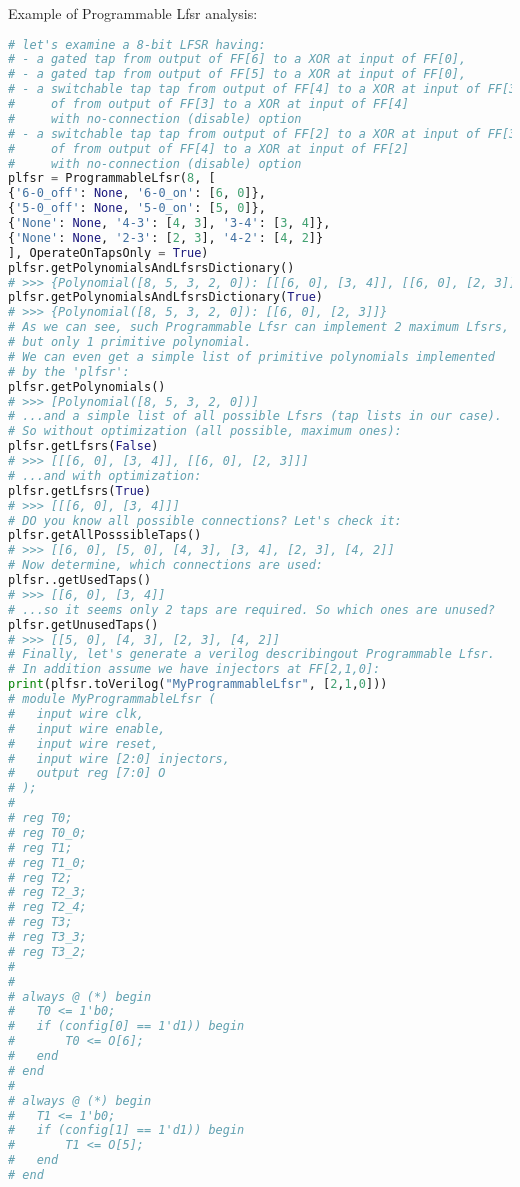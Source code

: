 \label{programmablelfsrexample}
Example of Programmable Lfsr analysis:
\begin{lstlisting}[language=Python]
# let's examine a 8-bit LFSR having:
# - a gated tap from output of FF[6] to a XOR at input of FF[0], 
# - a gated tap from output of FF[5] to a XOR at input of FF[0], 
# - a switchable tap tap from output of FF[4] to a XOR at input of FF[3]
#     of from output of FF[3] to a XOR at input of FF[4]
#     with no-connection (disable) option
# - a switchable tap tap from output of FF[2] to a XOR at input of FF[3]
#     of from output of FF[4] to a XOR at input of FF[2]
#     with no-connection (disable) option
plfsr = ProgrammableLfsr(8, [
{'6-0_off': None, '6-0_on': [6, 0]},
{'5-0_off': None, '5-0_on': [5, 0]},
{'None': None, '4-3': [4, 3], '3-4': [3, 4]},
{'None': None, '2-3': [2, 3], '4-2': [4, 2]}
], OperateOnTapsOnly = True)
plfsr.getPolynomialsAndLfsrsDictionary()
# >>> {Polynomial([8, 5, 3, 2, 0]): [[[6, 0], [3, 4]], [[6, 0], [2, 3]]]}
plfsr.getPolynomialsAndLfsrsDictionary(True)
# >>> {Polynomial([8, 5, 3, 2, 0]): [[6, 0], [2, 3]]}
# As we can see, such Programmable Lfsr can implement 2 maximum Lfsrs,
# but only 1 primitive polynomial.
# We can even get a simple list of primitive polynomials implemented
# by the 'plfsr':
plfsr.getPolynomials()
# >>> [Polynomial([8, 5, 3, 2, 0])]
# ...and a simple list of all possible Lfsrs (tap lists in our case).
# So without optimization (all possible, maximum ones):
plfsr.getLfsrs(False)
# >>> [[[6, 0], [3, 4]], [[6, 0], [2, 3]]]
# ...and with optimization:
plfsr.getLfsrs(True)
# >>> [[[6, 0], [3, 4]]]
# DO you know all possible connections? Let's check it:
plfsr.getAllPosssibleTaps()
# >>> [[6, 0], [5, 0], [4, 3], [3, 4], [2, 3], [4, 2]]
# Now determine, which connections are used:
plfsr..getUsedTaps()
# >>> [[6, 0], [3, 4]]
# ...so it seems only 2 taps are required. So which ones are unused?
plfsr.getUnusedTaps()
# >>> [[5, 0], [4, 3], [2, 3], [4, 2]]
# Finally, let's generate a verilog describingout Programmable Lfsr.
# In addition assume we have injectors at FF[2,1,0]:
print(plfsr.toVerilog("MyProgrammableLfsr", [2,1,0]))
# module MyProgrammableLfsr (
# 	input wire clk,
# 	input wire enable,
# 	input wire reset,
# 	input wire [2:0] injectors,
# 	output reg [7:0] O
# );
# 
# reg T0;
# reg T0_0;
# reg T1;
# reg T1_0;
# reg T2;
# reg T2_3;
# reg T2_4;
# reg T3;
# reg T3_3;
# reg T3_2;
# 
# 
# always @ (*) begin
# 	T0 <= 1'b0;
# 	if (config[0] == 1'd1)) begin
# 		T0 <= O[6];
# 	end
# end
# 
# always @ (*) begin
# 	T1 <= 1'b0;
# 	if (config[1] == 1'd1)) begin
# 		T1 <= O[5];
# 	end
# end


\end{lstlisting}
